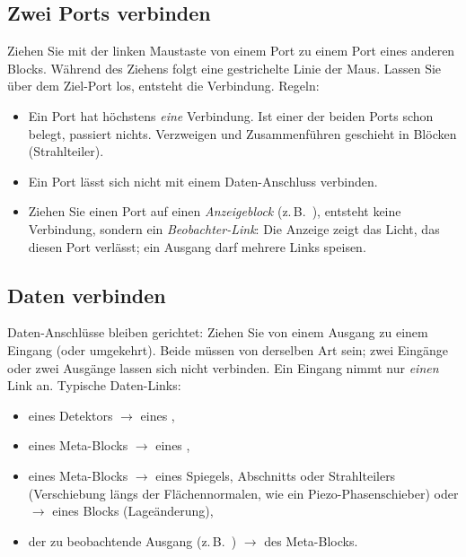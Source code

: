 \subsection{Zwei Ports verbinden}

Ziehen Sie mit der linken Maustaste von einem Port zu einem Port eines anderen Blocks. Während
des Ziehens folgt eine gestrichelte Linie der Maus. Lassen Sie über dem Ziel-Port los, entsteht
die Verbindung. Regeln:

\begin{itemize}
  \item Ein Port hat höchstens \emph{eine} Verbindung. Ist einer der beiden Ports schon belegt,
        passiert nichts. Verzweigen und Zusammenführen geschieht in Blöcken (Strahlteiler).
  \item Ein Port lässt sich nicht mit einem Daten-Anschluss verbinden.
  \item Ziehen Sie einen Port auf einen \emph{Anzeigeblock} (z.\,B.\ ),
        entsteht keine Verbindung, sondern ein \emph{Beobachter-Link}: Die Anzeige zeigt das Licht,
        das diesen Port verlässt; ein Ausgang darf mehrere Links speisen.
\end{itemize}

\subsection{Daten verbinden}

Daten-Anschlüsse bleiben gerichtet: Ziehen Sie von einem Ausgang zu einem Eingang (oder
umgekehrt). Beide müssen von derselben Art sein; zwei Eingänge oder zwei Ausgänge lassen sich nicht
verbinden. Ein Eingang nimmt nur \emph{einen} Link an. Typische Daten-Links:

\begin{itemize}
  \item {} eines Detektors $\to$  eines ,
  \item {} eines Meta-Blocks $\to$  eines ,
  \item {} eines Meta-Blocks $\to$  eines Spiegels, Abschnitts oder
        Strahlteilers (Verschiebung längs der Flächennormalen, wie ein Piezo-Phasenschieber)
        oder $\to$  eines Blocks (Lageänderung),
  \item der zu beobachtende Ausgang (z.\,B.\ ) $\to$  des
        Meta-Blocks.
\end{itemize}

